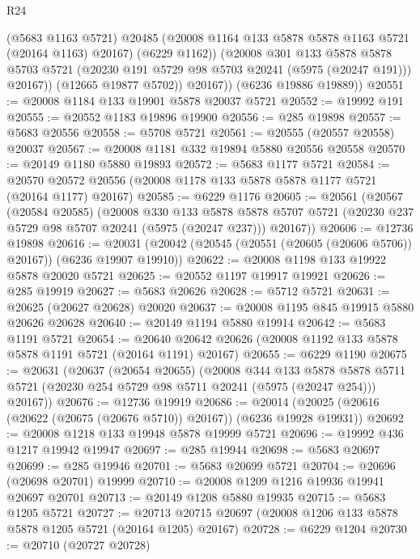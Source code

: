 \begin{lexlean}{R24}
\begin{coremodule}
                (@5683 @1163 @5721)
                @20485
                (@20008 @1164 @133 @5878 @5878 @1163 @5721 (@20164 @1163) @20167)
                (@6229 @1162))
              (@20008
                @301
                @133
                @5878
                @5878
                @5703
                @5721
                (@20230 @191 @5729 @98 @5703 @20241 (@5975 (@20247 @191)))
                @20167))
            (@12665 @19877 @5702))
          @20167))
      (@6236 @19886 @19889))
@20551 := @20008 @1184 @133 @19901 @5878 @20037 @5721
@20552 := @19992 @191
@20555 := @20552 @1183 @19896 @19900
@20556 := @285 @19898
@20557 := @5683 @20556
@20558 := @5708 @5721
@20561 := @20555 (@20557 @20558) @20037
@20567 := @20008 @1181 @332 @19894 @5880 @20556 @20558
@20570 := @20149 @1180 @5880 @19893
@20572 := @5683 @1177 @5721
@20584 := @20570 @20572 @20556 (@20008 @1178 @133 @5878 @5878 @1177 @5721 (@20164 @1177) @20167)
@20585 := @6229 @1176
@20605 := @20561
    (@20567
      (@20584 @20585)
      (@20008
        @330
        @133
        @5878
        @5878
        @5707
        @5721
        (@20230 @237 @5729 @98 @5707 @20241 (@5975 (@20247 @237)))
        @20167))
@20606 := @12736 @19898
@20616 := @20031 (@20042 (@20545 (@20551 (@20605 (@20606 @5706)) @20167)) (@6236 @19907 @19910))
@20622 := @20008 @1198 @133 @19922 @5878 @20020 @5721
@20625 := @20552 @1197 @19917 @19921
@20626 := @285 @19919
@20627 := @5683 @20626
@20628 := @5712 @5721
@20631 := @20625 (@20627 @20628) @20020
@20637 := @20008 @1195 @845 @19915 @5880 @20626 @20628
@20640 := @20149 @1194 @5880 @19914
@20642 := @5683 @1191 @5721
@20654 := @20640 @20642 @20626 (@20008 @1192 @133 @5878 @5878 @1191 @5721 (@20164 @1191) @20167)
@20655 := @6229 @1190
@20675 := @20631
    (@20637
      (@20654 @20655)
      (@20008
        @344
        @133
        @5878
        @5878
        @5711
        @5721
        (@20230 @254 @5729 @98 @5711 @20241 (@5975 (@20247 @254)))
        @20167))
@20676 := @12736 @19919
@20686 := @20014 (@20025 (@20616 (@20622 (@20675 (@20676 @5710)) @20167)) (@6236 @19928 @19931))
@20692 := @20008 @1218 @133 @19948 @5878 @19999 @5721
@20696 := @19992 @436 @1217 @19942 @19947
@20697 := @285 @19944
@20698 := @5683 @20697
@20699 := @285 @19946
@20701 := @5683 @20699 @5721
@20704 := @20696 (@20698 @20701) @19999
@20710 := @20008 @1209 @1216 @19936 @19941 @20697 @20701
@20713 := @20149 @1208 @5880 @19935
@20715 := @5683 @1205 @5721
@20727 := @20713 @20715 @20697 (@20008 @1206 @133 @5878 @5878 @1205 @5721 (@20164 @1205) @20167)
@20728 := @6229 @1204
@20730 := @20710 (@20727 @20728)

\end{coremodule}
\end{lexlean}
